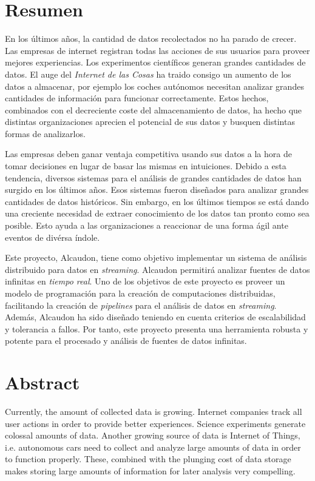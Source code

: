 \chapter{Resumen}

En los últimos años, la cantidad de datos recolectados no ha parado de crecer.
Las empresas de internet registran todas las acciones de sus usuarios para
proveer mejores experiencias. Los experimentos científicos generan grandes
cantidades de datos. El auge del \textit{Internet de las Cosas} ha traido
consigo un aumento de los datos a almacenar, por ejemplo los coches autónomos
necesitan analizar grandes cantidades de información para funcionar
correctamente. Estos hechos, combinados con el decreciente coste del
almacenamiento de datos, ha hecho que distintas organizaciones aprecien el
potencial de sus datos y busquen distintas formas de analizarlos.

Las empresas deben ganar ventaja competitiva usando sus datos a la hora de tomar
decisiones en lugar de basar las mismas en intuiciones. Debido a esta tendencia,
diversos sistemas para el análisis de grandes cantidades de datos han surgido en
los últimos años. Esos sistemas fueron diseñados para analizar grandes
cantidades de datos históricos. Sin embargo, en los últimos tiempos se está
dando una creciente necesidad de extraer conocimiento de los datos tan pronto
como sea posible. Esto ayuda a las organizaciones a reaccionar de una forma ágil
ante eventos de divérsa índole.

Este proyecto, Alcaudon, tiene como objetivo implementar un sistema de análisis
distribuido para datos en \textit{streaming}. Alcaudon permitirá analizar
fuentes de datos infinitas en \textit{tiempo real}. Uno de los objetivos de este
proyecto es proveer un modelo de programación para la creación de computaciones
distribuidas, facilitando la creación de \textit{pipelines} para el análisis de
datos en \textit{streaming}. Además, Alcaudon ha sido diseñado teniendo en
cuenta criterios de escalabilidad y tolerancia a fallos. Por tanto, este
proyecto presenta una herramienta robusta y potente para el procesado y análisis
de fuentes de datos infinitas.


\chapter{Abstract}

Currently, the amount of collected data is growing. Internet companies track all
user actions in order to provide better experiences. Science experiments
generate colossal amounts of data. Another growing source of data is Internet
of Things, i.e. autonomous cars need to collect and analyze large amounts of
data in order to function properly. These, combined with the plunging cost of
data storage makes storing large amounts of information for later analysis very
compelling.

